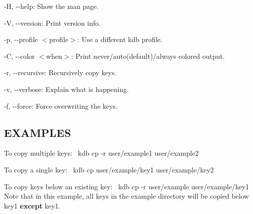 \begin{DoxyItemize}
\item {\ttfamily -\/H}, {\ttfamily -\/-\/help}\+: Show the man page.
\item {\ttfamily -\/V}, {\ttfamily -\/-\/version}\+: Print version info.
\item {\ttfamily -\/p}, {\ttfamily -\/-\/profile $<$profile$>$}\+: Use a different kdb profile.
\item {\ttfamily -\/C}, {\ttfamily -\/-\/color $<$when$>$}\+: Print never/auto(default)/always colored output.
\item {\ttfamily -\/r}, {\ttfamily -\/-\/recursive}\+: Recursively copy keys.
\item {\ttfamily -\/v}, {\ttfamily -\/-\/verbose}\+: Explain what is happening.
\item {\ttfamily -\/f}, {\ttfamily -\/-\/force}\+: Force overwriting the keys.
\end{DoxyItemize}

\subsection*{E\+X\+A\+M\+P\+L\+ES}

To copy multiple keys\+:~\newline
 {\ttfamily kdb cp -\/r user/example1 user/example2}

To copy a single key\+:~\newline
 {\ttfamily kdb cp user/example/key1 user/example/key2}

To copy keys below an existing key\+:~\newline
 {\ttfamily kdb cp -\/r user/example user/example/key1}~\newline
 Note that in this example, all keys in the example directory will be copied below {\ttfamily key1} {\bfseries except} {\ttfamily key1}. 